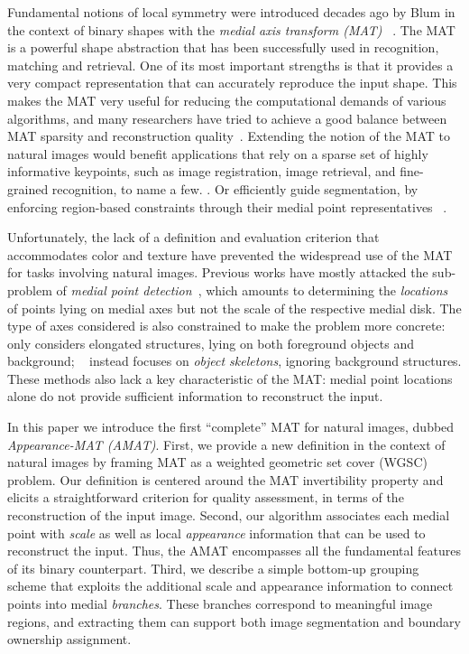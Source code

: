 \documentclass[10pt,twocolumn,letterpaper]{article}
\begin{document}
Fundamental notions of local symmetry were introduced decades ago by Blum in the context 
of binary shapes with the \emph{medial axis transform (MAT)}~\cite{blum1967transformation,blum1973biological} .
The MAT is a powerful shape abstraction 
that has been successfully used in recognition, matching and retrieval. 
One of its most important strengths is that it provides a very compact representation that can
accurately reproduce the input shape. 
This makes the MAT very useful for reducing the computational demands of various algorithms, 
and many researchers have tried to achieve a good balance
between MAT sparsity and reconstruction quality~\cite{tam2003shape,li2015q}.
Extending the notion of the MAT to natural images would  benefit applications that rely on
a sparse set of highly informative keypoints, such as image registration, image retrieval, and fine-grained recognition, to name a few.
.
Or efficiently guide segmentation, by enforcing region-based constraints through their medial point representatives
~\cite{teo2015detection}.

Unfortunately, the lack of a definition and evaluation criterion 
that accommodates color and texture have prevented the widespread use of the MAT for tasks involving natural images.
Previous works have mostly attacked the sub-problem of \emph{medial point detection}~\cite{tsogkas2012learning,shen2016object},
which amounts to determining the \emph{locations} of points lying on medial axes 
but not the scale of the respective medial disk.
The type of axes considered is also constrained to make the problem more concrete:
\cite{tsogkas2012learning} only considers elongated structures, lying on both foreground objects and background; 
~\cite{shen2016object} instead focuses on \emph{object skeletons}, ignoring background structures.
These methods also lack a key characteristic of the MAT: medial point locations alone do not provide sufficient
information to reconstruct the input.

In this paper we introduce the first ``complete'' MAT for natural images, dubbed \emph{Appearance-MAT (AMAT)}.
First, we provide a new definition in the context of natural images by framing MAT 
as a weighted geometric set cover (WGSC) problem.
Our definition is centered around the MAT invertibility property and elicits 
a straightforward criterion for quality assessment, in terms of the reconstruction of the input image.
Second, our algorithm associates each medial point with \emph{scale} as well as local \emph{appearance} information
that can be used to reconstruct the input.
Thus, the AMAT encompasses all the fundamental features of its  binary counterpart. 
Third, we describe a simple bottom-up grouping scheme that exploits the additional scale and appearance information to connect
points into medial \emph{branches}.
These branches correspond to meaningful image regions, and extracting them can support both image segmentation
and boundary ownership assignment.
\end{document}
